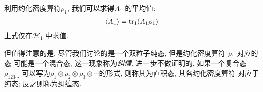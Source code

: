 利用约化密度算符$\rho_1$, 我们可以求得$A_1$ 的平均值:
\begin{equation}
  \begin{aligned}
    \langle A_1 \rangle = {\rm tr}_{1}(A_1 \rho_1)
  \end{aligned}
\end{equation}
上式仅在$\mathcal{H}_{1}$ 中求值.

但值得注意的是, 尽管我们讨论的是一个双粒子纯态, 但是约化密度算符 $\rho_1$ 对应的态
可能是一个混合态, 这一现象称为\emph{纠缠}. 进一步不做证明的, 如果一个复合态$\rho_{123\cdots}$ 
可以写为$\rho_1\otimes \rho_2 \otimes \rho_3\otimes \cdots$的形式, 则称其为直积态, 其各约化密度算符
对应于纯态; 反之则称为纠缠态.


